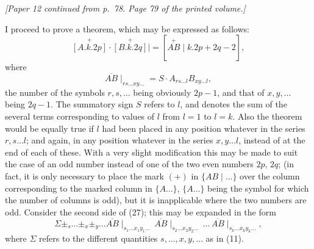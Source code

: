 \documentclass[11pt]{article}
\begin{document}

\noindent\textit{[Paper 12 continued from p.~78. Page 79 of the printed volume.]}

\medskip

I proceed to prove a theorem, which may be expressed as follows:
\[
\overset{+}{[A.k.2p]} \cdot \overset{+}{[B.k.2q]} \mid = [\overset{+}{AB} \mid k.2p+2q-2] \tag{27},
\]
where
\[
\overline{AB} \mid_{rs\ldots xy\ldots} = S \cdot A_{rs\ldots l} B_{xy\ldots l} \tag{28},
\]
the number of the symbols $r, s, \ldots$ being obviously $2p-1$, and that of $x, y, \ldots$ being
$2q-1$. The summatory sign $S$ refers to $l$, and denotes the sum of the several terms
corresponding to values of $l$ from $l=1$ to $l=k$. Also the theorem would be equally
true if $l$ had been placed in any position whatever in the series $r, s \ldots l$; and again,
in any position whatever in the series $x, y \ldots l$, instead of at the end of each of these.
With a very slight modification this may be made to suit the case of an odd number
instead of one of the two even numbers $2p,\, 2q$; (in fact, it is only necessary to place
the mark $(+)$ in $\{AB\mid \ldots\}$ over the column corresponding to the marked column in
$\{A\ldots\}$, $\{A\ldots\}$ being the symbol for which the number of columns is odd), but it is
inapplicable where the two numbers are odd. Consider the second side of (27); this
may be expanded in the form
\[
\Sigma \pm_s \ldots \pm_x \pm_y \ldots \overline{AB}\mid_{s_1\ldots x_1y_1\ldots}\,\overline{AB}\mid_{s_2\ldots x_2y_2\ldots}\,\ldots\,\overline{AB}\mid_{s_k\ldots x_ky_k\ldots} \tag{29},
\]
where $\Sigma$ refers to the different quantities $s, \ldots, x, y, \ldots$ as in (11).
\end{document}
